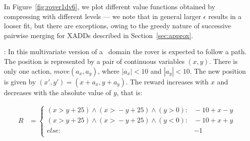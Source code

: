 In Figure~\ref{fig:rover1dv6}, we plot different value functions obtained by compressing with different levels --- we note that in general larger $\epsilon$ results in a looser fit, but there are exceptions, owing to the greedy nature of successive pairwise merging for XADDs described in Section~\ref{sec:approx}.

\MarsRoverBi: In this multivariate version of a \MarsRover~domain %
 the rover is expected to follow a path. The position is represented by a pair of continuous variables $(x,y)$. There is only one action, $move(a_x,a_y)$, where $|a_x| < 10$ and $|a_y| < 10$. The new position is given by $(x',y') = ( x+a_x, y+a_y)$. The reward increases with $x$ and decreases with the absolute value of $y$, that is:

\vspace{-6mm}
{\footnotesize
\begin{align*}
R & = \begin{cases}
(x \!>\! y +25) \wedge (x \!>\! - y  +25) \wedge (y \!>\!0): &\!\!-10 + x -y\\
(x \!>\! y +25) \wedge (x \!>\! - y  +25) \wedge (y \!<\!0): &\!\!-10 + x +y\\
else: & -1\\
\end{cases}
\end{align*}}
\vspace{-6mm}

